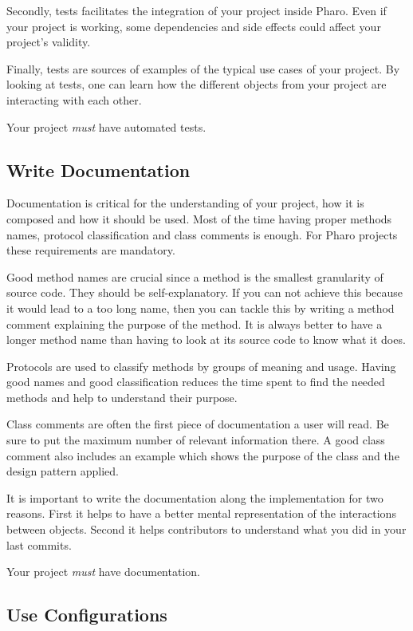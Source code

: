 \documentclass[10pt]{article}
\begin{document}
Secondly, tests facilitates the integration of your project inside Pharo. Even if your project is working, some dependencies and side effects could affect your project's validity.

Finally, tests are sources of examples of the typical use cases of your project. By looking at tests, one can learn how the different objects from your project are interacting with each other.

Your project \emph{must} have automated tests.

\subsection{Write Documentation}

Documentation is critical for the understanding of your project, how it is composed and how it should be used. Most of the time having proper methods names, protocol classification and class comments is enough. For Pharo projects these requirements are mandatory.

Good method names are crucial since a method is the smallest granularity of source code.
They should be self-explanatory. If you can not achieve this because it would lead to a too long name, then you can tackle this by writing a method comment explaining the purpose of the method. It is always better to have a longer method name than having to look at its source code to know what it does.

Protocols are used to classify methods by groups of meaning and usage. Having good names and good classification reduces the time spent to find the needed methods and help to understand their purpose.

Class comments are often the first piece of documentation a user will read. Be sure to put the maximum number of relevant information there. A good class comment also includes an example which shows the purpose of the class and the design pattern applied.

It is important to write the documentation along the implementation for two reasons. First it helps to have a better mental representation of the interactions between objects. Second it helps contributors to understand what you did in your last commits.

Your project \emph{must} have documentation.

\subsection{Use Configurations}\label{subsec:configurations}
\end{document}
